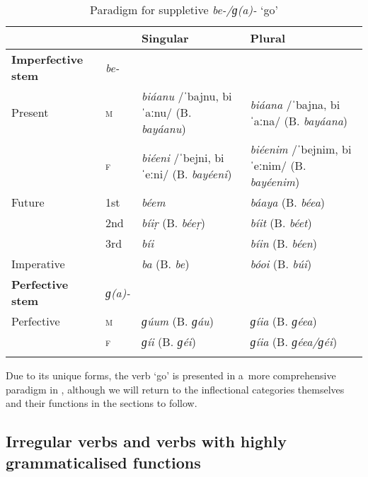 \begin{table}[ht]
\caption{Paradigm for suppletive \textit{be-/ɡ(a)-} `go'}

\begin{tabularx}{\textwidth}{ l@{\hspace{20pt}} l@{\hspace{20pt}} Q Q }
\lsptoprule
&
&
Singular &
Plural\\\hline
\textbf{Imperfective stem} &
\textit{be-} &
&
\\
Present &
\textsc{m} &
\textit{biáanu} /ˈbajnu, biˈaːnu/\newline
(B. \textit{bayáanu}) &
\textit{biáana} /ˈbajna, biˈaːna/\newline
(B. \textit{bayáana})\\
&
\textsc{f} &
\textit{biéeni} /ˈbejni, biˈeːni/\newline
(B. \textit{bayéeni}) &
\textit{biéenim} /ˈbejnim, biˈeːnim/ \newline
(B. \textit{bayéenim})\\
Future &
1st &
\textit{béem} &
\textit{báaya} (B. \textit{béea})\\
&
2nd &
\textit{bíiṛ} (B. \textit{béeṛ}) &
\textit{bíit} (B. \textit{béet})\\
&
3rd &
\textit{bíi} &
\textit{bíin} (B. \textit{béen})\\
Imperative &
&
\textit{ba} (B. \textit{be}) &
\textit{bóoi} (B. \textit{búi})\\
\textbf{Perfective stem} &
\textit{ɡ(a)-} &
&
\\
Perfective &
\textsc{m} &
\textit{ɡúum} (B. \textit{ɡáu}) &
\textit{ɡíia} (B. \textit{ɡéea})\\
&
\textsc{f} &
\textit{ɡíi} (B. \textit{ɡéi}) &
\textit{ɡíia} (B. \textit{ɡéea/ɡéi})\\\lspbottomrule
\end{tabularx}
\label{tab:8-13}
\end{table}

Due to its unique forms, the verb `go' is presented in a~more comprehensive paradigm in , although we will return to the inflectional categories themselves and their functions in the sections to follow.

\subsection{Irregular verbs and verbs with highly grammaticalised functions}
\label{subsec:8-3-12}

